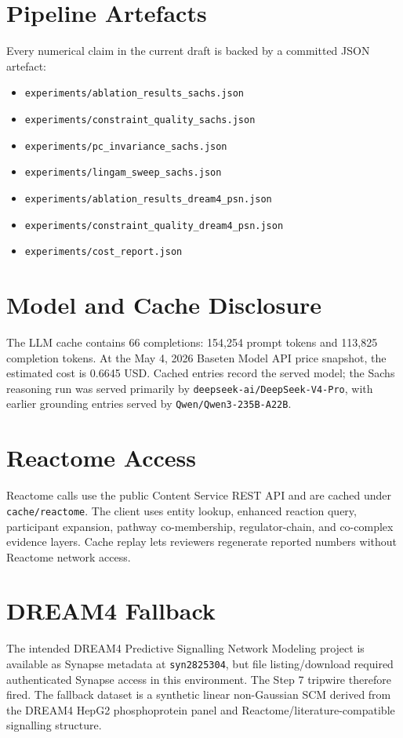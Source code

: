 \section{Pipeline Artefacts}

Every numerical claim in the current draft is backed by a committed JSON
artefact:

\begin{itemize}
  \item \texttt{experiments/ablation\_results\_sachs.json}
  \item \texttt{experiments/constraint\_quality\_sachs.json}
  \item \texttt{experiments/pc\_invariance\_sachs.json}
  \item \texttt{experiments/lingam\_sweep\_sachs.json}
  \item \texttt{experiments/ablation\_results\_dream4\_psn.json}
  \item \texttt{experiments/constraint\_quality\_dream4\_psn.json}
  \item \texttt{experiments/cost\_report.json}
\end{itemize}

\section{Model and Cache Disclosure}

The LLM cache contains 66 completions: 154,254 prompt tokens and 113,825
completion tokens. At the May 4, 2026 Baseten Model API price snapshot, the
estimated cost is 0.6645 USD. Cached entries record the served model; the Sachs
reasoning run was served primarily by \texttt{deepseek-ai/DeepSeek-V4-Pro}, with
earlier grounding entries served by \texttt{Qwen/Qwen3-235B-A22B}.

\section{Reactome Access}

Reactome calls use the public Content Service REST API and are cached under
\texttt{cache/reactome}. The client uses entity lookup, enhanced reaction query,
participant expansion, pathway co-membership, regulator-chain, and co-complex
evidence layers. Cache replay lets reviewers regenerate reported numbers without
Reactome network access.

\section{DREAM4 Fallback}

The intended DREAM4 Predictive Signalling Network Modeling project is available
as Synapse metadata at \texttt{syn2825304}, but file listing/download required
authenticated Synapse access in this environment. The Step 7 tripwire therefore
fired. The fallback dataset is a synthetic linear non-Gaussian SCM derived from
the DREAM4 HepG2 phosphoprotein panel and Reactome/literature-compatible
signalling structure.
